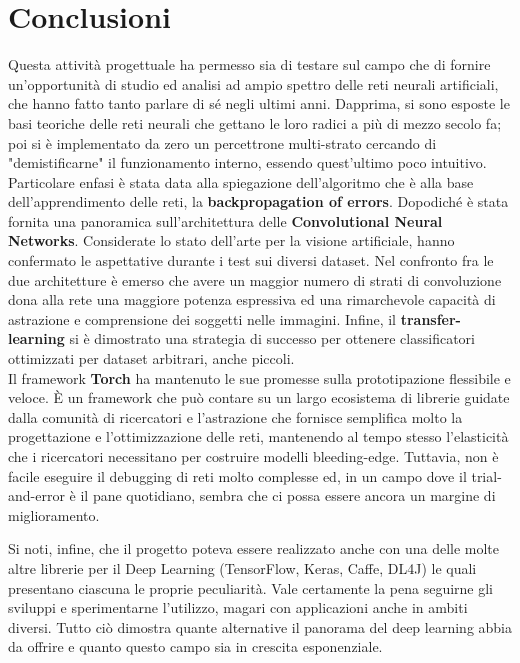 \chapter{Conclusioni} 
Questa attività progettuale ha permesso sia di testare sul campo che di fornire un'opportunità di studio ed analisi ad ampio spettro delle reti neurali artificiali, che hanno fatto tanto parlare di sé negli ultimi anni. Dapprima, si sono esposte le basi teoriche delle reti neurali che gettano le loro radici a più di mezzo secolo fa; poi si è implementato da zero un percettrone multi-strato cercando di "demistificarne" il funzionamento interno, essendo quest'ultimo poco intuitivo. Particolare enfasi è stata data alla spiegazione dell'algoritmo che è alla base dell'apprendimento delle reti, la \textbf{backpropagation of errors}. Dopodiché è stata fornita una panoramica sull'architettura delle \textbf{Convolutional Neural Networks}. Considerate lo stato dell'arte per la visione artificiale, hanno confermato le aspettative durante i test sui diversi dataset. Nel confronto fra le due architetture è emerso che avere un maggior numero di strati di convoluzione dona alla rete una maggiore potenza espressiva ed una rimarchevole capacità di astrazione e comprensione dei soggetti nelle immagini. Infine, il \textbf{transfer-learning} si è dimostrato una strategia di successo per ottenere classificatori ottimizzati per dataset arbitrari, anche piccoli. 
\\
Il framework \textbf{Torch} ha mantenuto le sue promesse sulla prototipazione flessibile e veloce. È un framework che può contare su un largo ecosistema di librerie guidate dalla comunità di ricercatori e l'astrazione che fornisce semplifica molto la progettazione e l'ottimizzazione delle reti, mantenendo al tempo stesso l'elasticità che i ricercatori necessitano per costruire modelli bleeding-edge. Tuttavia, non è facile eseguire il debugging di reti molto complesse ed, in un campo dove il trial-and-error è il pane quotidiano, sembra che ci possa essere ancora un margine di miglioramento. 

Si noti, infine, che il progetto poteva essere realizzato anche con una delle molte altre librerie per il Deep Learning (TensorFlow, Keras, Caffe, DL4J) le quali presentano ciascuna le proprie peculiarità. Vale certamente la pena seguirne gli sviluppi e sperimentarne l'utilizzo, magari con applicazioni anche in ambiti diversi. Tutto ciò dimostra quante alternative il panorama del deep learning abbia da offrire e quanto questo campo sia in crescita esponenziale.








